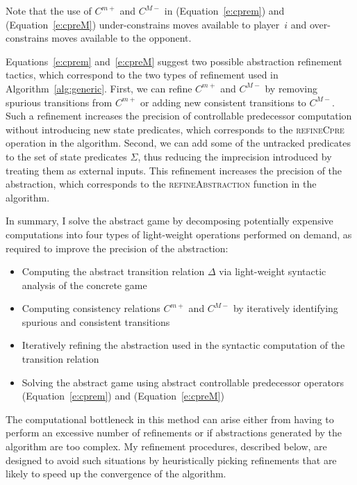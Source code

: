 Note that the use of $C^{m+}$ and $C^{M-}$ in (Equation~\ref{e:cprem}) and (Equation~\ref{e:cpreM}) under-constrains moves available to player~$i$ and over-constrains moves available to the opponent.  

Equations~\ref{e:cprem} and~\ref{e:cpreM} suggest two possible abstraction refinement tactics, which correspond to the two types of refinement used in Algorithm~\ref{alg:generic}.  First, we can refine $C^{m+}$ and $C^{M-}$ by removing spurious transitions from $C^{m+}$ or adding new consistent transitions to $C^{M-}$.  Such a refinement increases the precision of controllable predecessor computation without introducing new state predicates, which corresponds to the \textsc{refineCpre} operation in the algorithm.  Second, we can add some of the untracked predicates to the set of state predicates $\Sigma$, thus reducing the imprecision introduced by treating them as external inputs.  This refinement increases the precision of the abstraction, which corresponds to the \textsc{refineAbstraction} function in the algorithm.

In summary, I solve the abstract game by decomposing potentially expensive computations into four types of light-weight operations performed on demand, as required to improve the precision of the abstraction:

\begin{itemize}
    \item Computing the abstract transition relation $\Delta$ via light-weight syntactic analysis of the concrete game
    \item Computing consistency relations $C^{m+}$ and $C^{M-}$ by iteratively identifying spurious and consistent transitions
    \item Iteratively refining the abstraction used in the syntactic computation of the transition relation
    \item Solving the abstract game using abstract controllable predecessor operators (Equation~\ref{e:cprem}) and (Equation~\ref{e:cpreM})
\end{itemize}

The computational bottleneck in this method can arise either from having to perform an excessive number of refinements or if abstractions generated by the algorithm are too complex.  My refinement procedures, described below, are designed to avoid such situations by heuristically picking refinements that are likely to speed up the convergence of the algorithm.

